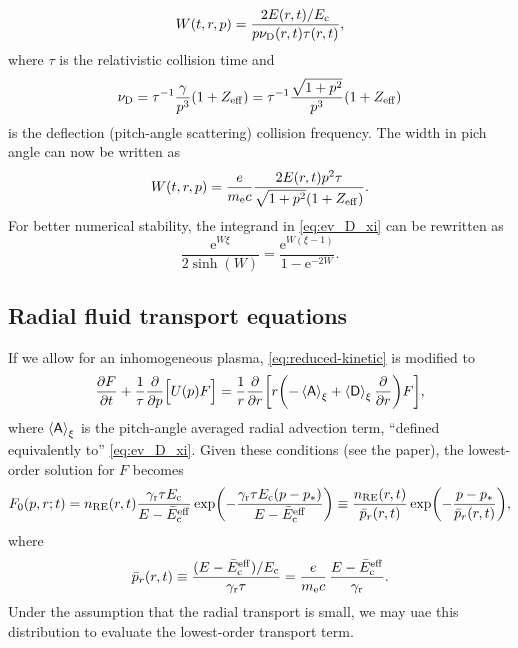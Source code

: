 \documentclass[11pt,a4paper,english
]{article}
\newcommand{\ee}{\mathrm{e}}
\newcommand{\nRE}{\ensuremath{n_{\rm RE}}}
\newcommand{\nuD}{\ensuremath{\nu_{\rm D}}}
\begin{document}
\begin{equation}
W(t,r,p) = \frac{2E(r,t)/E_{\rm c}}{p\nuD(r,t)\tau(r,t)},
\end{equation}
where $\tau$ is the relativistic collision time and
\begin{equation}
\nuD = \tau^{-1}\frac{\gamma}{p^3}(1+Z_{\rm eff})
= \tau^{-1}\frac{\sqrt{1+p^2}}{p^3}(1+Z_{\rm eff})
\end{equation}
is the deflection (pitch-angle scattering) collision
frequency. The width in pich angle can now be written as
\begin{equation}
W(t,r,p) = \frac{e}{m_{\ee}c}\frac{2E(r,t)p^2\tau}{\sqrt{1+p^2}(1+Z_{\rm eff})}.
\end{equation}
For better numerical stability, the integrand in \eqref{eq:ev_D_xi}
can be rewritten as
\begin{equation}
\frac{\ee^{W\xi}}{2\sinh(W)}
= \frac{\ee^{W(\xi-1)}}{1-\ee^{-2W}}.
\end{equation}


\subsection{Radial fluid transport equations}
If we allow for an inhomogeneous plasma, \eqref{eq:reduced-kinetic} is
modified to
\begin{equation}\label{eq:reduced-kinetic_VD}
\pdv{F}{t}+\frac{1}{\tau}\pdv{p}\qty[\Big.U(p)F]
=\frac{1}{r}\pdv{r}\qty[r\qty(-\ev{\mathsf{A}}_\xi+\ev{\mathsf{D}}_\xi\pdv{r})F],
\end{equation}
where $\ev{\mathsf{A}}_\xi$ is the pitch-angle averaged radial
advection term, ``defined equivalently to'' \eqref{eq:ev_D_xi}. Given
these conditions (see the paper), the lowest-order solution for $F$
becomes
\begin{equation}
F_0(p,r;t) = \nRE(r,t)
\frac{\gamma_{\rm r}\tau E_{\rm c}}{E-\bar{E}_{\rm c}^{\rm eff}}
\exp(-\frac{\gamma_{\rm r}\tau E_{\rm c}(p-p_{*})}{E-\bar{E}_{\rm c}^{\rm eff}})
\equiv \frac{\nRE(r,t)}{\bar{p}_r(r,t)}\exp(-\frac{p-p_{*}}{\bar{p}_r(r,t)}),
\end{equation}
where %
\begin{equation}
\bar{p}_r(r,t)\equiv\frac{(E-\bar{E}_{\rm c}^{\rm eff})/E_{\rm c}}
{\gamma_{\rm r}\tau}
=\frac{e}{m_{\ee}c}\,\frac{E-\bar{E}_{\rm c}^{\rm eff}}
{\gamma_{\rm r}}.
\end{equation}
Under the assumption that the radial transport is small, we may uae
this distribution to evaluate the lowest-order transport term.
\end{document}
